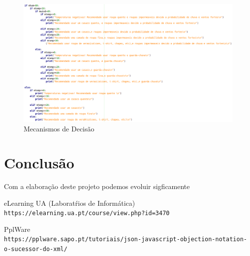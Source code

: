\documentclass[a4paper,12pt]{report}
\begin{document}
\vspace{10mm}
\begin{figure}[h]
\center
\includegraphics[width=16cm]{imagens/mecdecisao.png}
\caption{Mecanismos de Decisão}
\end{figure}
\clearpage

\chapter{Conclusão}
Com a elaboração deste projeto podemos evoluir sigficamente 
\label{conclusão}

\clearpage



\begin{thebibliography}{20}

\bibitem{} 
eLearning UA (Laboratŕios de Informática) \\\texttt{https://elearning.ua.pt/course/view.php?id=3470}

\bibitem{} 
PplWare \\\texttt{https://pplware.sapo.pt/tutoriais/json-javascript-objection-notation-o-sucessor-do-xml/}

\end{thebibliography}
\end{document}
